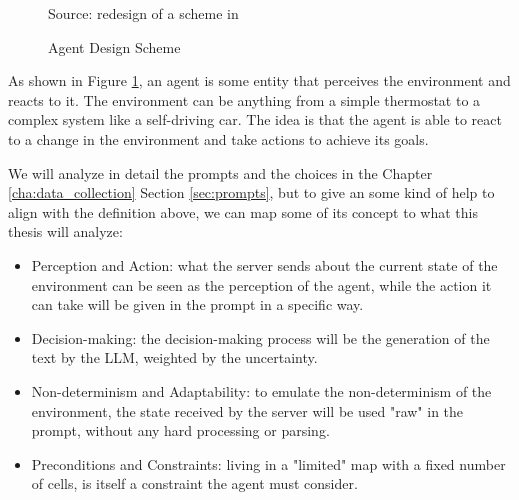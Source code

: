 \vspace{1cm} %
\begin{figure}[h!]
  \centering
  \caption{Agent Design Scheme}
  { Source: redesign of a scheme in \cite{wooldridge2002multiagent}} \label{fig:agent_scheme}
\end{figure}
\vspace{1cm} %

As shown in Figure \ref{fig:agent_scheme}, an agent is some entity that perceives
the environment and reacts to it. The environment can be anything from a simple
thermostat to a complex system like a self-driving car. The idea is that the agent
is able to react to a change in the environment and take actions to achieve its goals.

We will analyze in detail the prompts and the choices in the Chapter \ref{cha:data_collection}
Section \ref{sec:prompts}, but to give an some kind of help to align with the
definition above, we can map some of its concept to what this thesis will analyze:
\begin{itemize}
  \item Perception and Action: what the server sends about the current state of
    the environment can be seen as the perception of the agent, while the action
    it can take will be given in the prompt in a specific way.

  \item Decision-making: the decision-making process will be the generation of
    the text by the LLM, weighted by the uncertainty.

  \item Non-determinism and Adaptability: to emulate the non-determinism of the
    environment, the state received by the server will be used "raw" in the prompt,
    without any hard processing or parsing.

  \item Preconditions and Constraints: living in a "limited" map with a fixed
    number of cells, is itself a constraint the agent must consider.
\end{itemize}

